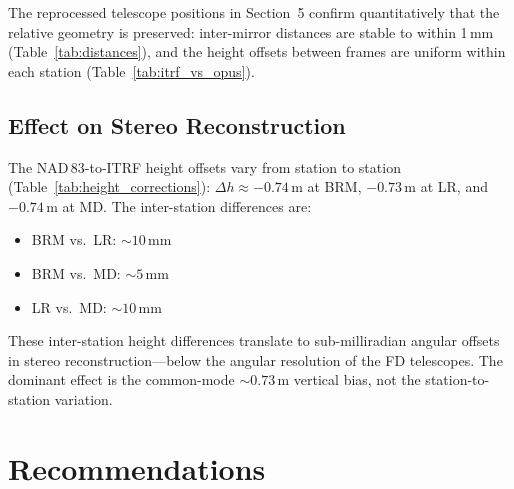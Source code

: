 \documentclass[11pt,letterpaper]{article}
\begin{document}
\noindent The reprocessed telescope positions in Section~5 confirm quantitatively that the relative geometry is preserved: inter-mirror distances are stable to within 1\,mm (Table~\ref{tab:distances}), and the height offsets between frames are uniform within each station (Table~\ref{tab:itrf_vs_opus}).

\subsection{Effect on Stereo Reconstruction}

The NAD\,83-to-ITRF height offsets vary from station to station (Table~\ref{tab:height_corrections}): $\Delta h \approx -0.74$\,m at BRM, $-0.73$\,m at LR, and $-0.74$\,m at MD. The inter-station differences are:

\begin{itemize}[nosep]
\item BRM vs.\ LR: $\sim\!10$\,mm
\item BRM vs.\ MD: $\sim\!5$\,mm
\item LR vs.\ MD: $\sim\!10$\,mm
\end{itemize}

\noindent These inter-station height differences translate to sub-milliradian angular offsets in stereo reconstruction---below the angular resolution of the FD telescopes. The dominant effect is the common-mode $\sim\!0.73$\,m vertical bias, not the station-to-station variation.

\section{Recommendations}
\end{document}
